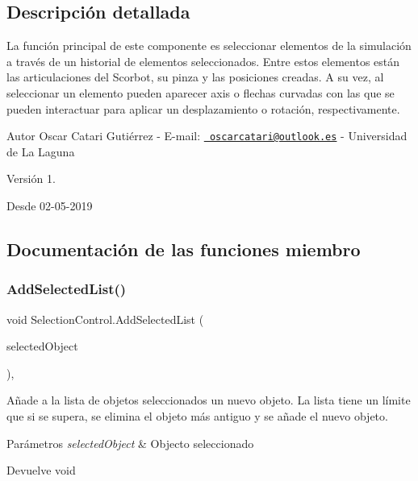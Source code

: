 \subsection{Descripción detallada}
La función principal de este componente es seleccionar elementos de la simulación a través de un historial de elementos seleccionados. Entre estos elementos están las articulaciones del Scorbot, su pinza y las posiciones creadas. A su vez, al seleccionar un elemento pueden aparecer axis o flechas curvadas con las que se pueden interactuar para aplicar un desplazamiento o rotación, respectivamente. \begin{DoxyAuthor}{Autor}
Oscar Catari Gutiérrez -\/ E-\/mail\+: \href{mailto:oscarcatari@outlook.es}{\texttt{ oscarcatari@outlook.\+es}} -\/ Universidad de La Laguna 
\end{DoxyAuthor}
\begin{DoxyVersion}{Versión}
1. 
\end{DoxyVersion}
\begin{DoxySince}{Desde}
02-\/05-\/2019 
\end{DoxySince}


\subsection{Documentación de las funciones miembro}
\mbox{\label{class_selection_control_ae0e2d8a1673fab1de51bee6e15d3f872}} 
\subsubsection{\texorpdfstring{AddSelectedList()}{AddSelectedList()}}
{\footnotesize\ttfamily void Selection\+Control.\+Add\+Selected\+List (\begin{DoxyParamCaption}\item[{Game\+Object}]{selected\+Object }\end{DoxyParamCaption})\hspace{0.3cm}{\ttfamily [inline]}, {\ttfamily [private]}}

Añade a la lista de objetos seleccionados un nuevo objeto. La lista tiene un límite que si se supera, se elimina el objeto más antiguo y se añade el nuevo objeto. 
\begin{DoxyParams}{Parámetros}
{\em selected\+Object} & Objecto seleccionado \\
\hline
\end{DoxyParams}
\begin{DoxyReturn}{Devuelve}
void 
\end{DoxyReturn}
\mbox{\label{class_selection_control_a41c82620db4b415375d6579c5a0aa17b}} 
